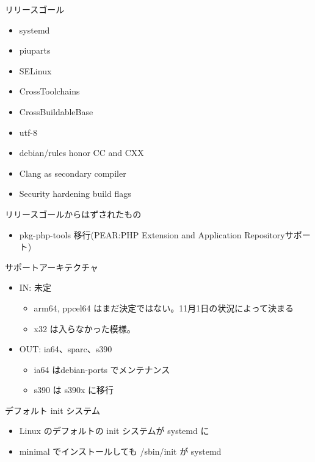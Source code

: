 \begin{frame}{リリースゴール}
\begin{itemize}
\item systemd
\item piuparts
\item SELinux
\item CrossToolchains
\item CrossBuildableBase
\item utf-8
\item debian/rules honor CC and CXX
\item Clang as secondary compiler
\item Security hardening build flags
\end{itemize}
\end{frame}


\begin{frame}{リリースゴールからはずされたもの}
\begin{itemize}
\item pkg-php-tools 移行(PEAR:PHP Extension and Application Repositoryサポート)
\end{itemize}
\end{frame}

\begin{frame}{サポートアーキテクチャ}

\begin{itemize}
\item IN: 未定
  \begin{itemize}
  \item arm64, ppcel64 はまだ決定ではない。11月1日の状況によって決まる
  \item x32 は入らなかった模様。
  \end{itemize}
\item OUT: ia64、sparc、s390
\begin{itemize}
\item ia64 はdebian-ports でメンテナンス
\item s390 は s390x に移行
\end{itemize}
\end{itemize}

\end{frame}

\begin{frame}{デフォルト init システム}

\begin{itemize}
\item Linux のデフォルトの init システムが systemd に
\item minimal でインストールしても /sbin/init が systemd
\end{itemize}

\end{frame}

